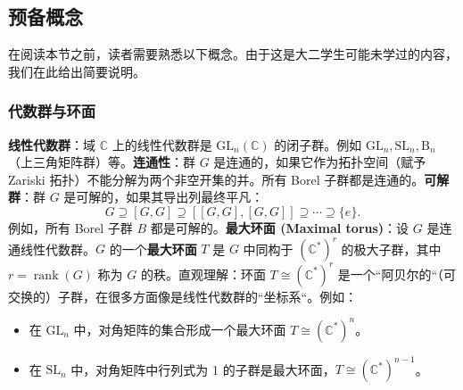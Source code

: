 \subsection{预备概念}在阅读本节之前，读者需要熟悉以下概念。由于这是大二学生可能未学过的内容，我们在此给出简要说明。\subsubsection{代数群与环面}\textbf{线性代数群}：域 $\mathbb{C}$ 上的线性代数群是 $\mathrm{GL}_n(\mathbb{C})$ 的闭子群。例如 $\mathrm{GL}_n, \mathrm{SL}_n, \mathrm{B}_n$（上三角矩阵群）等。\textbf{连通性}：群 $G$ 是连通的，如果它作为拓扑空间（赋予 Zariski 拓扑）不能分解为两个非空开集的并。所有 Borel 子群都是连通的。\textbf{可解群}：群 $G$ 是可解的，如果其导出列最终平凡：\[G \supseteq [G,G] \supseteq [ [G,G], [G,G] ] \supseteq \cdots \supseteq \{e\}.\]例如，所有 Borel 子群 $B$ 都是可解的。\textbf{最大环面 (Maximal torus)}：设 $G$ 是连通线性代数群。$G$ 的一个\textbf{最大环面} $T$ 是 $G$ 中同构于 $(\mathbb{C}^*)^r$ 的极大子群，其中 $r = \operatorname{rank}(G)$ 称为 $G$ 的秩。直观理解：环面 $T \cong (\mathbb{C}^*)^r$ 是一个``阿贝尔的``（可交换的）子群，在很多方面像是线性代数群的``坐标系``。例如：
\begin{itemize}
\item 在 $\mathrm{GL}_n$ 中，对角矩阵的集合形成一个最大环面 $T \cong (\mathbb{C}^*)^n$。\item 在 $\mathrm{SL}_n$ 中，对角矩阵中行列式为 1 的子群是最大环面，$T \cong (\mathbb{C}^*)^{n-1}$。
\end{itemize}


